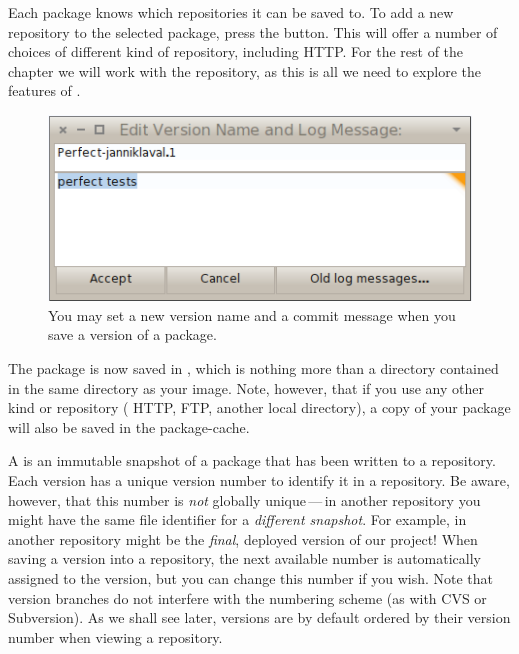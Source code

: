 \documentclass[a4paper,10pt,twoside]{book}
\begin{document}
Each package knows which repositories it can be saved to.
To add a new repository to the selected package, press the  button. This will offer a number of choices of different kind of repository, including HTTP. For the rest of the chapter we will work with the  repository, as this is all we need to explore the features of \Mont.


\begin{figure}[ht]\centering
	\includegraphics[width=.6\textwidth]{saving}
	\caption{You may set a new version name and a commit message when you save a version of a package.}
\end{figure}

The  package is now saved in , which is nothing more than a directory contained in the same directory as your \pharo image. Note, however, that if you use any other kind or repository (\eg{} HTTP, FTP, another local directory), a copy of your package will also be saved in the package-cache. 



A  is an immutable snapshot of a package that has been written to a repository. Each version has a unique version number to identify it in a repository.
Be aware, however, that this number is \emph{not} globally unique\,---\,in another repository you might have the same file identifier for a \emph{different snapshot}. For example,  in another repository might be the \emph{final}, deployed version of our project!
When saving a version into a repository, the next available number is automatically assigned to the version, but you can change this number if you wish.
Note that version branches do not interfere with the numbering scheme (as with CVS or Subversion). As we shall see later, versions are by default ordered by their version number when viewing a repository.
\end{document}

